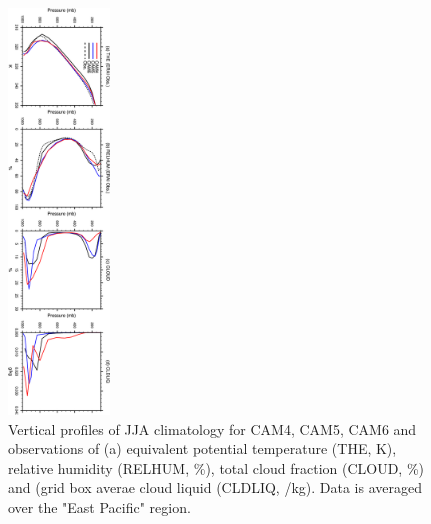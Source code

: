 \clearpage
\begin{figure}[t]
  \begin{center}
    \includegraphics[width=0.24\textwidth,angle=90.]{./figs/f_VPROF_EPAC_JJA.pdf}
  \end{center}
  \caption{Vertical profiles of JJA climatology for CAM4, CAM5, CAM6 and observations of (a) equivalent potential temperature (THE, K), relative humidity (RELHUM, \%), total cloud fraction (CLOUD, \%) and (grid box averae cloud liquid (CLDLIQ, \g/kg). Data is averaged over the "East Pacific" region.} 
\label{f_VPROF_NITCZ._JJA}
\end{figure} 


